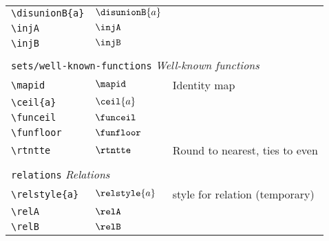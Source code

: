 \begin{longtable}{lll}
  {\color[rgb]{0.5,0.5,0.5}\texttt{\textbackslash disunionB\{a\}}}                                          & $\disunionB{a}$
  & \\
  {\color[rgb]{0.5,0.5,0.5}\texttt{\textbackslash injA}}                                                    & $\injA$                    & \\
  {\color[rgb]{0.5,0.5,0.5}\texttt{\textbackslash injB}}                                                    & $\injB$                    &                                                         \\
  &                            &                                                         \\
  \multicolumn{3}{l}{{\color[rgb]{0.5,0.5,0.5}\texttt{sets/well-known-functions}} \emph{Well-known functions}}
  \\
  \hline
  {\color[rgb]{0.5,0.5,0.5}\texttt{\textbackslash mapid}}                                                   & $\mapid$                   & Identity map\\
  {\color[rgb]{0.5,0.5,0.5}\texttt{\textbackslash ceil\{a\}}}                                               & $\ceil{a}$                 & \\
  {\color[rgb]{0.5,0.5,0.5}\texttt{\textbackslash funceil}}                                                 & $\funceil$                 & \\
  {\color[rgb]{0.5,0.5,0.5}\texttt{\textbackslash funfloor}}                                                & $\funfloor$                & \\
  {\color[rgb]{0.5,0.5,0.5}\texttt{\textbackslash rtntte}}                                                  & $\rtntte$                  & Round to nearest, ties to even                          \\
  &                            &                                                         \\
  \multicolumn{3}{l}{{\color[rgb]{0.5,0.5,0.5}\texttt{relations}} \emph{Relations}}
  \\
  \hline
  \hline
  {\color[rgb]{0.5,0.5,0.5}\texttt{\textbackslash relstyle\{a\}}}                                           & $\relstyle{a}$             & style for relation (temporary)\\
  {\color[rgb]{0.5,0.5,0.5}\texttt{\textbackslash relA}}                                                    & $\relA$                    & \\
  {\color[rgb]{0.5,0.5,0.5}\texttt{\textbackslash relB}}                                                    & $\relB$                    & \\

\end{longtable}
